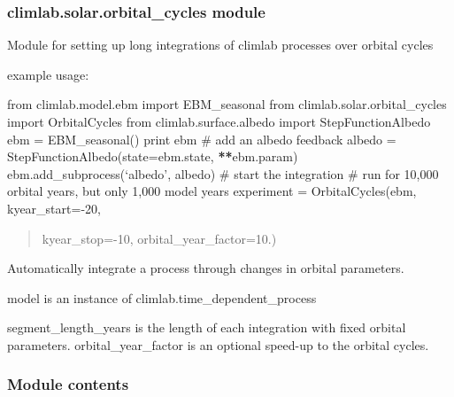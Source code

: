 \documentclass[letterpaper,10pt,english]{sphinxmanual}
\begin{document}
\subsubsection{climlab.solar.orbital\_cycles module}
\label{api/climlab.solar:module-climlab.solar.orbital_cycles}\label{api/climlab.solar:climlab-solar-orbital-cycles-module}
Module for setting up long integrations of climlab processes
over orbital cycles

example usage:

from climlab.model.ebm import EBM\_seasonal
from climlab.solar.orbital\_cycles import OrbitalCycles
from climlab.surface.albedo import StepFunctionAlbedo
ebm = EBM\_seasonal()
print ebm
\#  add an albedo feedback
albedo = StepFunctionAlbedo(state=ebm.state, {\color{red}\bfseries{}**}ebm.param)
ebm.add\_subprocess(`albedo', albedo)
\#  start the integration
\#  run for 10,000 orbital years, but only 1,000 model years
experiment = OrbitalCycles(ebm, kyear\_start=-20,
\begin{quote}

kyear\_stop=-10, orbital\_year\_factor=10.)
\end{quote}

\begin{fulllineitems}
\label{api/climlab.solar:climlab.solar.orbital_cycles.OrbitalCycles}
Automatically integrate a process through changes in orbital parameters.

model is an instance of climlab.time\_dependent\_process

segment\_length\_years is the length of each integration with fixed orbital parameters.
orbital\_year\_factor is an optional speed-up to the orbital cycles.

\end{fulllineitems}



\subsubsection{Module contents}
\label{api/climlab.solar:module-contents}\label{api/climlab.solar:module-climlab.solar}
\end{document}
